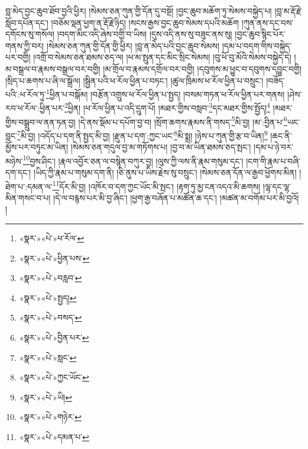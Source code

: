 བླ་མེད་བྱང་ཆུབ་ཐོབ་བྱའི་ཕྱིར། །སེམས་ཅན་ཀུན་གྱི་དོན་དུ་བསྔོ། །བྱང་ཆུབ་མཆོག་ཏུ་སེམས་བསྐྱེད་པ། །བླ་མ་རྡོ་རྗེ་སློབ་དཔོན་དང་། །བཅོམ་ལྡན་ཕྱག་ན་རྡོ་རྗེ་ཉིད། །སངས་རྒྱས་བྱང་ཆུབ་སེམས་དཔའི་མཆོག །ཀུན་ནས་དང་བས་དགོངས་སུ་གསོལ། །བདག་མིང་འདི་ཞེས་བགྱི་བ་ཡིས། །དུས་འདི་ནས་སུ་བཟུང་ནས་སུ། །བྱང་ཆུབ་སྙིང་པོར་གནས་ཀྱི་བར། །སེམས་ཅན་ཀུན་གྱི་དོན་གྱི་ཕྱིར། །བླ་ན་མེད་པའི་བྱང་ཆུབ་སེམས། །དམ་པ་བདག་གིས་བསྐྱེད་པར་བགྱི། །འགྲོ་བ་སེམས་ཅན་ཐམས་ཅད་ལ། །ཕ་མ་སྤུན་དང་མིང་སྲིང་སེམས། །བུ་ཕོ་བུ་མོའི་སེམས་བསྐྱེད་དེ། །མ་བསྒྲལ་བ་རྣམས་བསྒྲལ་བར་བགྱི། །མ་གྲོལ་བ་རྣམས་དགྲོལ་བར་བགྱི། །དབུགས་མ་ཕྱུང་བ་དབུགས་དབྱུང་བགྱི། །སྲིད་པ་ཆགས་པ་ཞི་ལ་སྒྲོལ། །སྦྱིན་པའི་ཕ་རོལ་ཕྱིན་པ་བཏང་། །ཚུལ་ཁྲིམས་ཕ་རོལ་ཕྱིན་པ་བསྲུང་། །བཟོད་པའི་:ཕ་རོལ་ཏུ་\footnote{«སྣར་»«པེ་»ཕ་རོལ་}ཕྱིན་པ་བསྒོམ། །བརྩོན་འགྲུས་ཕ་རོལ་ཕྱིན་པ་སྤྱད། །བསམ་གཏན་ཕ་རོལ་ཕྱིན་པར་གནས། །ཤེས་རབ་ཕ་རོལ་:ཕྱིན་པར་\footnote{«སྣར་»«པེ་»ཕྱིན་པས་}ཕྱིན། །ཕ་རོལ་ཕྱིན་པ་འདི་དྲུག་པོ། །མཐར་གྱིས་བསླབ་\footnote{«སྣར་»«པེ་»བརླབ་}དང་མཐར་གྱིས་སྤྱོད།\footnote{«སྣར་»«པེ་»སྤྱད།} །མཐར་གྱིས་བསྒྲུབ་ལ་ནན་ཏན་བྱ། །དེ་ནས་སྡོམ་པ་དཔོག་བྱ་བ། །སྲོག་ཆགས་རྣམས་ནི་གསད་\footnote{«སྣར་»«པེ་»བསད་}མི་བྱ། །མ་:བྱིན་པ་\footnote{«སྣར་»«པེ་»བྱིན་པར་}ཡང་བླང་\footnote{«སྣར་»«པེ་»སླང་}མི་བྱ། །འདོད་པ་དག་ནི་སྤྱད་མི་བྱ། །རྫུན་པ་དག་:ཀྱང་ཡང་\footnote{«སྣར་»«པེ་»ཀྱང་ཡོང་}མི་སྨྲ། །ཉེས་པ་ཀུན་གྱི་རྩ་བ་ཡིན།\footnote{«སྣར་»«པེ་»ཡི།} །ཆང་ནི་མྱོས་པར་བཏུང་མ་ཡིན། །སེམས་ཅན་གདུལ་བྱ་མ་གཏོགས་པ། །བྱ་བ་མ་ཡིན་ཐམས་ཅད་སྤང་། །དམ་པ་ཉེ་བར་མཉེས་\footnote{«སྣར་»«པེ་»གཉེར་}བྱས་ཤིང་། །རྣལ་འབྱོར་ཅན་ལ་བསྙེན་བཀུར་བྱ། །ལུས་ཀྱི་ལས་ནི་རྣམ་གསུམ་དང་། །ངག་གི་རྣམ་པ་བཞི་དག་དང་། །ཡིད་ཀྱི་རྣམ་པ་གསུམ་དག་ནི། །ཅི་ནུས་པ་ཡིས་རྗེས་སུ་བསྲུང་། །སེམས་ཅན་དོན་ལ་རྒྱབ་ཕྱོགས་མིན། །ཐེག་པ་:དམན་ལ་\footnote{«སྣར་»«པེ་»དམན་པ་}དོར་མི་བྱ། །འཁོར་བ་དག་ཀྱང་ཡོང་མི་སྤང་། །རྟག་ཏུ་མྱ་ངན་འདའ་མི་ཆགས། །ལྷ་དང་ལྷ་མིན་གསང་བ་པ། །དེ་ལ་བརྙས་པར་མི་བྱ་ཞིང་། །ཕྱག་རྒྱ་བཞོན་པ་མཚོན་ཆ་དང་། །མཚན་མ་བགོམ་པར་མི་བྱའོ། །
